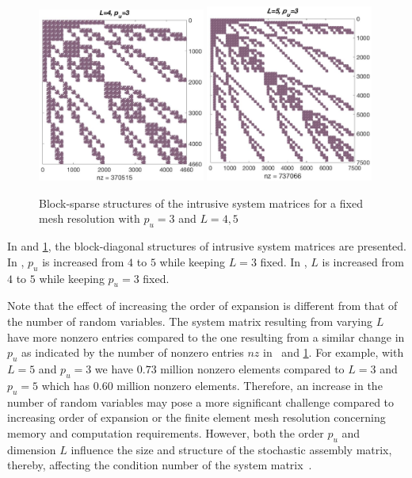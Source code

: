 \documentclass[letter,1p,11pt,oneside,onecolumn,sort&compress]{elsarticle}
\begin{document}
\begin{figure}[htbp]
\centering
 \includegraphics[width=0.49\textwidth,height=0.26\textheight]{plots/L4p3.eps}
 \includegraphics[width=0.49\textwidth,height=0.26\textheight]{plots/L5p3.eps}
 \caption{Block-sparse structures of the intrusive system matrices for a fixed mesh resolution with $p_{u}=3$ and $L=4,5$}
 \label{fig:sFEMdim}
\end{figure}
In  and \ref{fig:sFEMdim}, the block-diagonal structures of intrusive system matrices are presented. In , $p_{u}$ is increased from $4$ to $5$ while keeping $L=3$ fixed. In , $L$ is increased from $4$ to $5$
while keeping $p_{u}=3$ fixed.

Note that the effect of increasing the order of expansion is different from that of the number of random variables.
The system matrix resulting from varying $L$ have more nonzero entries compared to the one resulting from a similar change in $p_u$ as indicated by the number of nonzero entries $nz$ in~ and \ref{fig:sFEMdim}.
For example, with $L=5$ and $p_u=3$ we have $0.73$ million nonzero elements compared to $L=3$ and $p_u=5$ which has $0.60$ million nonzero elements. Therefore, an increase in the number of random variables may pose a more significant challenge compared to increasing order of expansion or the finite element mesh resolution concerning memory and computation requirements.  However, both the order $p_u$ and dimension $L$ influence the size and structure of the stochastic assembly matrix, thereby, affecting the condition number of the system matrix~\cite{ghanem1996numerical,pellissetti2000iterative}.
\end{document}
